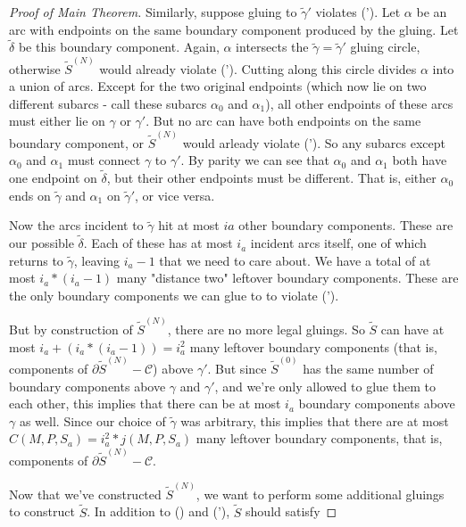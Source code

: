 \documentclass[12pt]{amsart}
\theoremstyle{definition}
\theoremstyle{remark}
\newcommand{\bd}{\partial}
\newcommand{\cC}{\mathcal{C}}
\begin{document}
\begin{proof}[Proof of Main Theorem]
Similarly, suppose gluing to $\widetilde{\gamma}'$ violates (\dag'). Let $\alpha$ be an
arc with endpoints on the same boundary component produced by the gluing. Let
$\widetilde{\delta}$ be this boundary component. Again, $\alpha$ intersects the
$\widetilde{\gamma} = \widetilde{\gamma}'$ gluing circle, otherwise $\widetilde{S}^{(N)}$ would already
violate (\dag').  Cutting along this circle divides $\alpha$ into a union of
arcs.  Except for the two original endpoints (which now lie on two different
subarcs - call these subarcs $\alpha_0$ and $\alpha_1$), all other endpoints of
these arcs must either lie on $\gamma$ or $\gamma'$.  But no arc can have both
endpoints on the same boundary component, or $\widetilde{S}^{(N)}$ would arleady violate
(\dag'). So any subarcs except $\alpha_0$ and $\alpha_1$ must connect $\gamma$ to
$\gamma'$.  By parity we can see that $\alpha_0$ and $\alpha_1$ both have one
endpoint on $\widetilde{\delta}$, but their other endpoints must be different. That is,
either $\alpha_0$ ends on $\widetilde{\gamma}$ and $\alpha_1$ on $\widetilde{\gamma}'$, or vice
versa.

Now the arcs incident to $\widetilde{\gamma}$ hit at most $ia$ other boundary
components. These are our possible $\widetilde{\delta}$. Each of these has at
most $i_a$ incident arcs itself, one of which returns to $\widetilde{\gamma}$,
leaving $i_a-1$ that we need to care about. We have a total of at most
$i_a*(i_a-1)$ many "distance two" leftover boundary components. These are the
only boundary components we can glue to to violate (\dag').

But by construction of $\widetilde{S}^{(N)}$, there are no more legal gluings. So
$\widetilde{S}$ can have at most $i_a+(i_a*(i_a-1)) = i_a^2$ many leftover boundary
components (that is, components of $\bd\widetilde{S}^{(N)}-\cC$) above $\gamma'$.  But since
$\widetilde{S}^{(0)}$ has the same number of boundary components above $\gamma$ and
$\gamma'$, and we're only allowed to glue them to each other, this implies that
there can be at most $i_a$ boundary components above $\gamma$ as well.  Since
our choice of $\widetilde{\gamma}$ was arbitrary, this implies that there are
at most $C(M,P,S_a) = i_a^2*j(M,P,S_a)$ many leftover boundary components, that
is, components of $\bd\widetilde{S}^{(N)}-\cC$.


Now that we've constructed $\widetilde{S}^{(N)}$, we want to perform some additional
gluings to construct $\widetilde{S}$. In addition to (\dag) and (\dag'), $\widetilde{S}$ should
satisfy


\end{proof}
\end{document}
